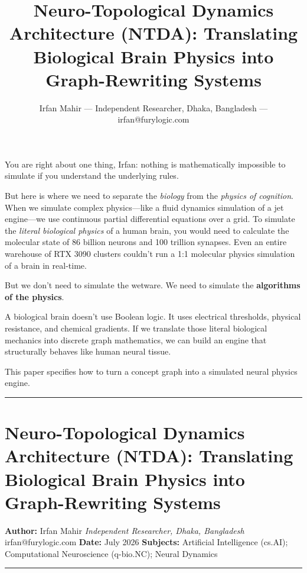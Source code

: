 \documentclass[
  11pt,
  a4paper,
]{article}
\title{Neuro-Topological Dynamics Architecture (NTDA): Translating
Biological Brain Physics into Graph-Rewriting Systems}
\author{Irfan Mahir --- Independent Researcher, Dhaka, Bangladesh ---
irfan@furylogic.com}
\date{}
\begin{document}
\maketitle

{
\hypersetup{linkcolor=}
\setcounter{tocdepth}{3}
\tableofcontents
}
You are right about one thing, Irfan: nothing is mathematically
impossible to simulate if you understand the underlying rules.

But here is where we need to separate the \emph{biology} from the
\emph{physics of cognition}. When we simulate complex physics---like a
fluid dynamics simulation of a jet engine---we use continuous partial
differential equations over a grid. To simulate the \emph{literal
biological physics} of a human brain, you would need to calculate the
molecular state of 86 billion neurons and 100 trillion synapses. Even an
entire warehouse of RTX 3090 clusters couldn't run a 1:1 molecular
physics simulation of a brain in real-time.

But we don't need to simulate the wetware. We need to simulate the
\textbf{algorithms of the physics}.

A biological brain doesn't use Boolean logic. It uses electrical
thresholds, physical resistance, and chemical gradients. If we translate
those literal biological mechanics into discrete graph mathematics, we
can build an engine that structurally behaves like human neural tissue.

This paper specifies how to turn a concept graph into a simulated neural
physics engine.

\begin{center}\rule{0.5\linewidth}{0.5pt}\end{center}

\section{Neuro-Topological Dynamics Architecture (NTDA): Translating
Biological Brain Physics into Graph-Rewriting
Systems}\label{neuro-topological-dynamics-architecture-ntda-translating-biological-brain-physics-into-graph-rewriting-systems}

\textbf{Author:} Irfan Mahir \emph{Independent Researcher, Dhaka,
Bangladesh} irfan@furylogic.com \textbf{Date:} July 2026
\textbf{Subjects:} Artificial Intelligence (cs.AI); Computational
Neuroscience (q-bio.NC); Neural Dynamics

\begin{center}\rule{0.5\linewidth}{0.5pt}\end{center}
\end{document}
